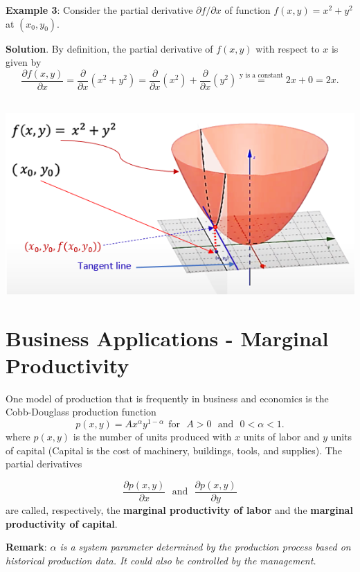 \documentclass[
]{book}
\begin{document}
\hfill\break

\textbf{Example 3}: Consider the partial derivative \(\partial f / \partial x\) of function \(f(x,y) = x^2 + y^2\) at \((x_0, y_0)\).

\textbf{Solution}. By definition, the partial derivative of \(f(x,y)\) with respect to \(x\) is given by
\[
\frac{\partial f(x,y)}{\partial x} = \frac{\partial}{\partial x}(x^2 + y^2) = \frac{\partial}{\partial x}(x^2) + \frac{\partial}{\partial x}(y^2)\stackrel{\text{y is a constant}}{=} 2x + 0 = 2x.
\]\\

\begin{center}\includegraphics[width=0.65\linewidth]{img14/w14-PartialGeometryExample} \end{center}

\hfill\break

\hypertarget{business-applications---marginal-productivity}{%
\section{Business Applications - Marginal Productivity}\label{business-applications---marginal-productivity}}

One model of production that is frequently in business and economics is the Cobb-Douglass production function
\[
p(x,y) = Ax^\alpha y^{1-\alpha}~~\text{for}~~~A>0 ~~~\text{and}~~~ 0<\alpha < 1.
\]
where \(p(x,y)\) is the number of units produced with \(x\) units of labor and \(y\) units of capital (Capital is the cost of machinery, buildings, tools, and supplies). The partial derivatives

\[
\frac{\partial p(x,y)}{\partial x}~~~\text{and}~~~\frac{\partial p(x,y)}{\partial y}
\]
are called, respectively, the \textbf{marginal productivity of labor} and the \textbf{marginal productivity of capital}.

\textbf{Remark}: \emph{\(\alpha\) is a system parameter determined by the production process based on historical production data. It could also be controlled by the management.}
\end{document}
